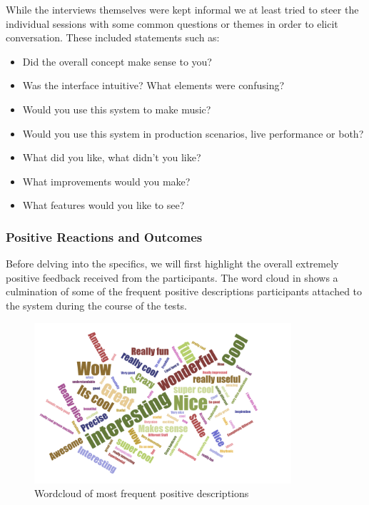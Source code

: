 While the interviews themselves were kept informal we at least tried to steer the individual sessions with some common questions or themes in order to elicit conversation. These included statements such as:

\begin{itemize}
  \item Did the overall concept make sense to you?
  \item Was the interface intuitive? What elements were confusing?
  \item Would you use this system to make music?
  \item Would you use this system in production scenarios, live performance or both?
  \item What did you like, what didn’t you like?
  \item What improvements would you make?
  \item What features would you like to see?
\end{itemize}

\subsubsection{Positive Reactions and Outcomes}

Before delving into the specifics, we will first highlight the overall extremely positive feedback received from the participants. The word cloud in  shows a culmination of some of the frequent positive descriptions participants attached to the system during the course of the tests.

\begin{figure}
	\begin{center}
		\includegraphics[width=0.85\textwidth]{ch07_evaluation/figures/wordcloud.png}
	\end{center}
	\caption[Wordcloud of most frequent positive descriptions]{Wordcloud of most frequent positive descriptions}
	\label{fig:wordcloud}
\end{figure}

